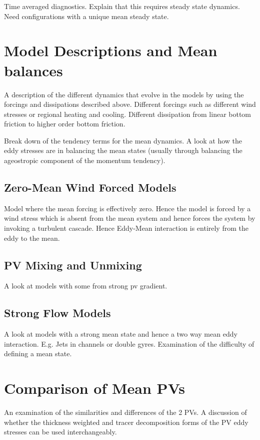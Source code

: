 \documentclass[10pt,a4paper]{article}
\begin{document}
Time averaged diagnostics. Explain that this 
requires steady state dynamics. Need configurations
with a unique mean steady state.

\section{Model Descriptions and Mean balances}

A description of the different dynamics that evolve
in the models by using the forcings and 
dissipations described above. Different forcings
such as different wind stresses or regional heating
and cooling. Different dissipation from
linear bottom friction to higher order bottom
friction.

Break down of the tendency terms for the mean
dynamics. A look at how the eddy stresses are 
in balancing the mean states (usually through
balancing the ageostropic component of the
momentum tendency).

\subsection{Zero-Mean Wind Forced Models}

Model where the mean forcing is effectively zero. 
Hence the model is forced by a wind stress which is
absent from the mean system and hence forces the
system by 
invoking a turbulent cascade. Hence Eddy-Mean
interaction is entirely from the eddy to the mean.

\subsection{PV Mixing and Unmixing}

A look at models with some from strong pv gradient.

\subsection{Strong Flow Models}

A look at models with a strong mean state and hence
a two way mean eddy interaction. E.g. Jets in
channels or double gyres. Examination of the
difficulty of defining a mean state.


\section{Comparison of Mean PVs}

An examination of the similarities and differences
of the 2 PVs. A discussion of whether the thickness
weighted and tracer decomposition forms of the
PV eddy stresses can be used interchangeably.
\end{document}

